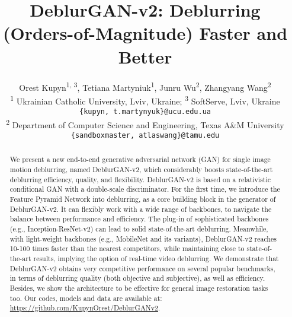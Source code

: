 \documentclass[10pt,twocolumn,letterpaper]{article}
\begin{document}
\def\httilde{\mbox{\tt\raisebox{-.5ex}{\symbol{126}}}}




\title{DeblurGAN-v2: Deblurring (Orders-of-Magnitude) Faster and Better}
\author{Orest Kupyn\textsuperscript{1, 3}, Tetiana Martyniuk\textsuperscript{1}, Junru Wu\textsuperscript{2}, Zhangyang Wang\textsuperscript{2} \vspace{2mm} \\
  \textsuperscript{1} Ukrainian Catholic University, Lviv, Ukraine; \qquad \textsuperscript{3} SoftServe, Lviv, Ukraine \\
  \texttt{\{kupyn, t.martynyuk\}@ucu.edu.ua} \vspace{2mm} \\
  \textsuperscript{2} Department of Computer Science and Engineering, Texas A{\&}M University \\
  \texttt{\{sandboxmaster,  atlaswang\}@tamu.edu}
}

\maketitle
\begin{abstract}
\vspace{-0.5em}
We present a new end-to-end generative adversarial network (GAN) for single image motion deblurring, named DeblurGAN-v2, which considerably boosts state-of-the-art deblurring efficiency, quality, and flexibility. DeblurGAN-v2 is based on a relativistic conditional GAN with a double-scale discriminator. For the first time, we introduce the Feature Pyramid Network into deblurring, as a core building block in the generator of DeblurGAN-v2. It can flexibly work with a wide range of backbones, to navigate the balance between performance and efficiency. The plug-in of sophisticated backbones (e.g., Inception-ResNet-v2) can lead to solid state-of-the-art deblurring. Meanwhile, with light-weight backbones (e.g., MobileNet and its variants), DeblurGAN-v2 reaches 10-100 times faster than the nearest competitors, while maintaining close to state-of-the-art results, implying the option of real-time video deblurring. We demonstrate that DeblurGAN-v2 obtains very competitive performance on several popular benchmarks, in terms of deblurring quality (both objective and subjective), as well as efficiency. Besides, we show the architecture to be effective for general image restoration tasks too. Our codes, models and data are available at: \url{https://github.com/KupynOrest/DeblurGANv2}.
\end{abstract}
\vspace{-1em}
\end{document}
